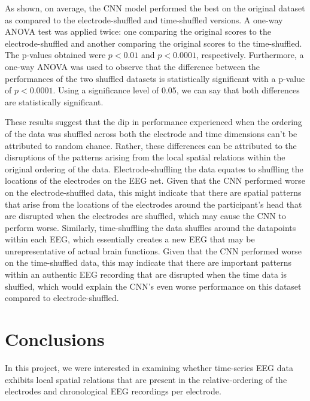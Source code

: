 \documentclass[11pt]{article}
\begin{document}
As shown, on average, the CNN model performed the best on the original dataset as compared to the electrode-shuffled and time-shuffled versions. A one-way ANOVA test was applied twice: one comparing the original scores to the electrode-shuffled and another comparing the original scores to the time-shuffled. The p-values obtained were $p < 0.01$ and $p < 0.0001$, respectively. Furthermore, a one-way ANOVA was used to observe that the difference between the performances of the two shuffled datasets is statistically significant with a p-value of $p < 0.0001$. Using a significance level of 0.05, we can say that both differences are statistically significant.

These results suggest that the dip in performance experienced when the ordering of the data was shuffled across both the electrode and time dimensions can't be attributed to random chance. Rather, these differences can be attributed to the disruptions of the patterns arising from the local spatial relations within the original ordering of the data. Electrode-shuffling the data equates to shuffling the locations of the electrodes on the EEG net. Given that the CNN performed worse on the electrode-shuffled data, this might indicate that there are spatial patterns that arise from the locations of the electrodes around the participant's head that are disrupted when the electrodes are shuffled, which may cause the CNN to perform worse. Similarly, time-shuffling the data shuffles around the datapoints within each EEG, which essentially creates a new  EEG that may be unrepresentative of actual brain functions. Given that the CNN performed worse on the time-shuffled data, this may indicate that there are important patterns within an authentic EEG recording that are disrupted when the time data is shuffled, which would explain the CNN's even worse performance on this dataset compared to electrode-shuffled.

\section{Conclusions}


In this project, we were interested in examining whether time-series EEG data exhibits local spatial relations that are present in the relative-ordering of the electrodes and chronological EEG recordings per electrode. 
\end{document}
